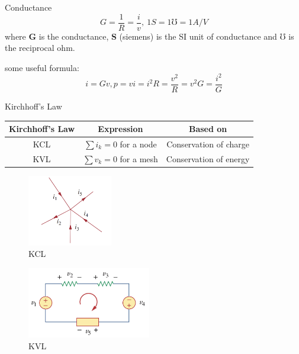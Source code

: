 \documentclass{beamer}
\begin{document}
\begin{frame}{Conductance}
\begin{equation*}
G=\dfrac{1}{R}=\dfrac{i}{v},\ 
1S=1\mho=1A/V
\end{equation*}
where \textbf{G} is the conductance, \textbf{S} (siemens) is the SI unit of conductance and $\mho$ is the reciprocal ohm.
\par
some useful formula:
$$i=Gv,p=vi=i^{2}R=\dfrac{v^2}{R}=v^{2}G=\dfrac{i^{2}}{G}$$
\end{frame}

\begin{frame}{Kirchhoff's Law}
\begin{table}[]
    \centering
    \begin{tabular}{ccc}
        \toprule
        Kirchhoff's Law & Expression & Based on \\
        \midrule
        KCL & $\sum i_k = 0$ for a node & Conservation of charge\\
        KVL & $\sum v_k = 0$ for a mesh & Conservation of energy\\
        \bottomrule
    \end{tabular}
\end{table}


\begin{multicols}{2}
    \sectiont{}
    \begin{figure}
    \centering
    \includegraphics[width=0.33\textwidth]{24.png}
    \caption{KCL}
    \end{figure}
    \sectiont{}
    \begin{figure}
        \centering
        \includegraphics[width=0.48\textwidth]{25.png}
        \caption{KVL}
    \end{figure}
    
    
\end{multicols}
\end{frame}
\end{document}
